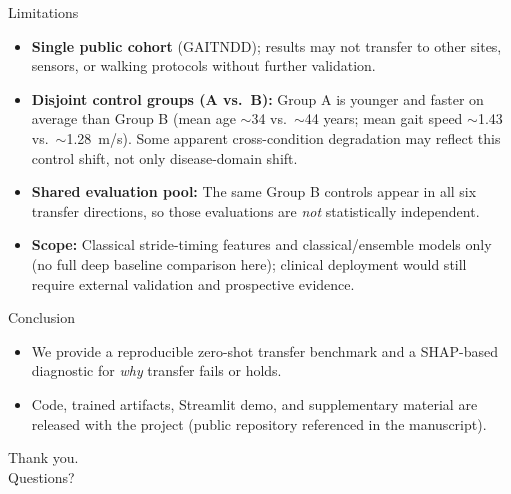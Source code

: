 \documentclass[aspectratio=43,10pt]{beamer}
\begin{document}
\begin{frame}{Limitations}
  \begin{itemize}
    \item \textbf{Single public cohort} (GAITNDD); results may not transfer to other sites, sensors, or walking protocols without further validation.
    \item \textbf{Disjoint control groups (A vs.\ B):} Group A is younger and faster on average than Group B (mean age $\sim$34 vs.\ $\sim$44 years; mean gait speed $\sim$1.43 vs.\ $\sim$1.28~m/s). Some apparent cross-condition degradation may reflect this control shift, not only disease-domain shift.
    \item \textbf{Shared evaluation pool:} The same Group B controls appear in all six transfer directions, so those evaluations are \emph{not} statistically independent.
    \item \textbf{Scope:} Classical stride-timing features and classical/ensemble models only (no full deep baseline comparison here); clinical deployment would still require external validation and prospective evidence.
  \end{itemize}
\end{frame}

\begin{frame}{Conclusion}
  \begin{itemize}
    \item We provide a reproducible zero-shot transfer benchmark and a SHAP-based diagnostic for \emph{why} transfer fails or holds.
    \item Code, trained artifacts, Streamlit demo, and supplementary material are released with the project (public repository referenced in the manuscript).
  \end{itemize}
\end{frame}

\begin{frame}[plain]
  \centering
  \vspace{2em}
  {\LARGE Thank you.}\\[1.5em]
  {\large Questions?}
\end{frame}
\end{document}
